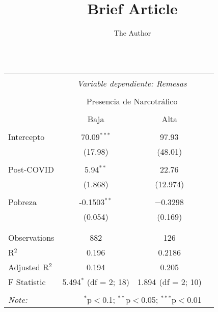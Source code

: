 \documentclass[11pt, oneside]{article}   	%
\title{Brief Article}
\author{The Author}
\begin{document}
\maketitle


\begin{table}[!htbp] \centering 
  \caption{} 
  \label{} 
\begin{tabular}{@{\extracolsep{5pt}}lccc} 
\\[-1.8ex]\hline 
\hline \\[-1.8ex] 
 & \multicolumn{2}{c}{\textit{Variable dependiente: Remesas}} \\ 
\cline{2-3} 
\\[-1.8ex] & \multicolumn{2}{c}{Presencia de Narcotráfico} \\ 
\\[-1.8ex] & Baja & Alta\\ 
\hline \\[-1.8ex] 
 Intercepto & 70.09$^{***}$ & 97.93$^{}$ \\ 
  & (17.98) & (48.01) \\ 
  & & \\ 
 Post-COVID & 5.94$^{**}$ & 22.76$^{}$ \\ 
  & (1.868) & (12.974) \\ 
  & & \\ 
 Pobreza & -0.1503$^{**}$ & $-$0.3298$^{}$ \\ 
  & (0.054) & (0.169) \\ 
  & & \\ 
\hline \\[-1.8ex] 
Observations & 882 & 126 \\ 
R$^{2}$ & 0.196 & 0.2186 \\ 
Adjusted R$^{2}$ & 0.194 & 0.205 \\ 
F Statistic & 5.494$^{*}$ (df = 2; 18) & 1.894$^{}$ (df = 2; 10) \\ 
\hline 
\hline \\[-1.8ex] 
\textit{Note:}  & \multicolumn{2}{r}{$^{*}$p$<$0.1; $^{**}$p$<$0.05; $^{***}$p$<$0.01} \\ 
\end{tabular} 
\end{table} 
\end{document}
